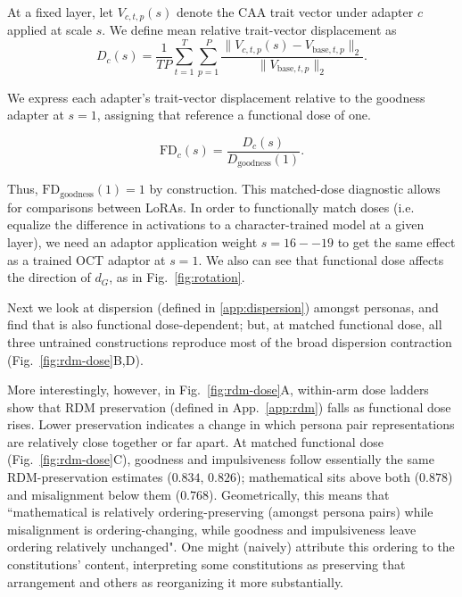 \documentclass{article}
\begin{document}
At a fixed layer, let $V_{c,t,p}(s)$ denote the CAA trait vector
under adapter $c$ applied at scale $s$. We define mean relative
trait-vector displacement as
\begin{equation}
D_c(s)
=
\frac{1}{TP}
\sum_{t=1}^{T}\sum_{p=1}^{P}
\frac{
    \|V_{c,t,p}(s)-V_{\mathrm{base},t,p}\|_2
}{
    \|V_{\mathrm{base},t,p}\|_2
}.
\end{equation}

We express each adapter’s trait-vector displacement relative to the goodness adapter at \(s=1\), assigning that reference a functional dose of one.

\begin{equation}
\mathrm{FD}_c(s)
=
\frac{D_c(s)}{D_{\mathrm{goodness}}(1)}.
\end{equation}

Thus, $\mathrm{FD}_{\mathrm{goodness}}(1)=1$ by construction.
This matched-dose diagnostic allows for comparisons between LoRAs. In order to functionally match doses (i.e. equalize the difference in activations to a character-trained model at a given layer), we need an adaptor application weight $s = 16--19$ to get the same effect as a trained OCT adaptor at $s = 1$. We also can see that functional dose affects the direction of $d_G$, as in Fig.~\ref{fig:rotation}. 

Next we look at dispersion (defined in \ref{app:dispersion}) amongst personas, and find that is also functional dose-dependent; but, at matched functional dose, all three untrained constructions reproduce most of the broad dispersion contraction (Fig.~\ref{fig:rdm-dose}B,D).

More interestingly, however, in Fig.~\ref{fig:rdm-dose}A, within-arm dose ladders show that RDM preservation (defined in App.~\ref{app:rdm}) falls as functional dose rises. Lower preservation indicates a change in which persona pair representations are relatively close together or far apart.  At matched functional dose (Fig.~\ref{fig:rdm-dose}C), goodness and impulsiveness follow essentially the same RDM-preservation estimates ($0.834$, $0.826$); mathematical sits above both ($0.878$) and misalignment below them ($0.768$). Geometrically, this means that ``mathematical is relatively ordering-preserving (amongst persona pairs) while misalignment is ordering-changing, while goodness and impulsiveness leave ordering relatively unchanged". One might (naively) attribute this ordering to the constitutions' content, interpreting some constitutions as preserving that arrangement and others as reorganizing it more substantially.
\end{document}
